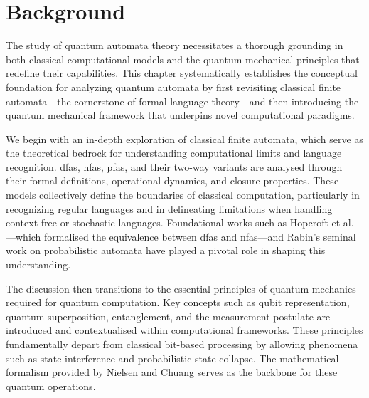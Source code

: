 \chapter{Background}  
\label{chap:background}

The study of quantum automata theory necessitates a thorough grounding in both classical computational models and the quantum mechanical principles that redefine their capabilities. This chapter systematically establishes the conceptual foundation for analyzing quantum automata by first revisiting classical finite automata—the cornerstone of formal language theory—and then introducing the quantum mechanical framework that underpins novel computational paradigms.

We begin with an in-depth exploration of classical finite automata, which serve as the theoretical bedrock for understanding computational limits and language recognition. \glspl{dfa}, \glspl{nfa}, \glspl{pfa}, and their two-way variants are analysed through their formal definitions, operational dynamics, and closure properties. These models collectively define the boundaries of classical computation, particularly in recognizing regular languages and in delineating limitations when handling context-free or stochastic languages. Foundational works such as Hopcroft et al. \cite{hopcroft2006introduction, sipser2012introduction}—which formalised the equivalence between \glspl{dfa} and \glspl{nfa}—and Rabin's seminal work on probabilistic automata \cite{rabin1963probabilistic} have played a pivotal role in shaping this understanding.

The discussion then transitions to the essential principles of quantum mechanics required for quantum computation. Key concepts such as qubit representation, quantum superposition, entanglement, and the measurement postulate are introduced and contextualised within computational frameworks. These principles fundamentally depart from classical bit-based processing by allowing phenomena such as state interference and probabilistic state collapse. The mathematical formalism provided by Nielsen and Chuang \cite{nielsen2010quantum} serves as the backbone for these quantum operations.



